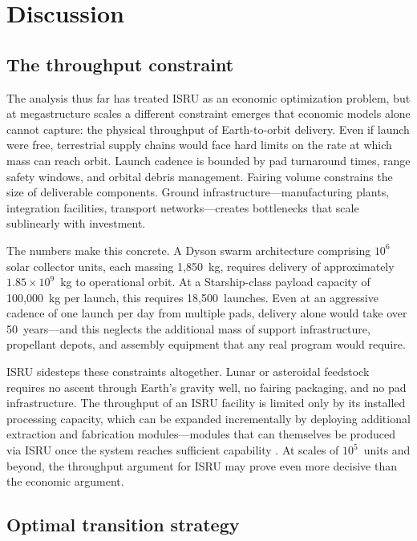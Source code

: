 \documentclass[preprint,12pt]{elsarticle}
\begin{document}
\section{Discussion}
\label{sec:discussion}

\subsection{The throughput constraint}

The analysis thus far has treated ISRU as an economic optimization problem, but at megastructure scales a different constraint emerges that economic models alone cannot capture: the physical throughput of Earth-to-orbit delivery. Even if launch were free, terrestrial supply chains would face hard limits on the rate at which mass can reach orbit. Launch cadence is bounded by pad turnaround times, range safety windows, and orbital debris management. Fairing volume constrains the size of deliverable components. Ground infrastructure---manufacturing plants, integration facilities, transport networks---creates bottlenecks that scale sublinearly with investment.

The numbers make this concrete. A Dyson swarm architecture comprising $10^6$ solar collector units, each massing 1{,}850~kg, requires delivery of approximately $1.85 \times 10^9$~kg to operational orbit. At a Starship-class payload capacity of 100{,}000~kg per launch, this requires 18{,}500~launches. Even at an aggressive cadence of one launch per day from multiple pads, delivery alone would take over 50~years---and this neglects the additional mass of support infrastructure, propellant depots, and assembly equipment that any real program would require.

ISRU sidesteps these constraints altogether. Lunar or asteroidal feedstock requires no ascent through Earth's gravity well, no fairing packaging, and no pad infrastructure. The throughput of an ISRU facility is limited only by its installed processing capacity, which can be expanded incrementally by deploying additional extraction and fabrication modules---modules that can themselves be produced via ISRU once the system reaches sufficient capability \cite{metzger2013}. At scales of $10^5$~units and beyond, the throughput argument for ISRU may prove even more decisive than the economic argument.

\subsection{Optimal transition strategy}
\end{document}
